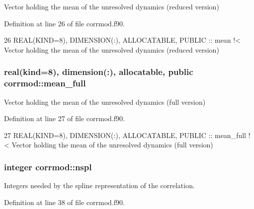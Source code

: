 Vector holding the mean of the unresolved dynamics (reduced version) 



Definition at line 26 of file corrmod.\+f90.


\begin{DoxyCode}
26   \textcolor{keywordtype}{REAL(KIND=8)}, \textcolor{keywordtype}{DIMENSION(:)}, \textcolor{keywordtype}{ALLOCATABLE}, \textcolor{keywordtype}{PUBLIC} :: mean\textcolor{comment}{ !< Vector holding the mean of the unresolved
       dynamics (reduced version)}
\end{DoxyCode}
\subsubsection[{\texorpdfstring{mean\+\_\+full}{mean_full}}]{\setlength{\rightskip}{0pt plus 5cm}real(kind=8), dimension(\+:), allocatable, public corrmod\+::mean\+\_\+full}\hypertarget{namespacecorrmod_a9c59d06165027aa6b1751e219726564a}{}\label{namespacecorrmod_a9c59d06165027aa6b1751e219726564a}


Vector holding the mean of the unresolved dynamics (full version) 



Definition at line 27 of file corrmod.\+f90.


\begin{DoxyCode}
27   \textcolor{keywordtype}{REAL(KIND=8)}, \textcolor{keywordtype}{DIMENSION(:)}, \textcolor{keywordtype}{ALLOCATABLE}, \textcolor{keywordtype}{PUBLIC} :: mean\_full\textcolor{comment}{ !< Vector holding the mean of the unresolved
       dynamics (full version)}
\end{DoxyCode}
\subsubsection[{\texorpdfstring{nspl}{nspl}}]{\setlength{\rightskip}{0pt plus 5cm}integer corrmod\+::nspl\hspace{0.3cm}{\ttfamily [private]}}\hypertarget{namespacecorrmod_afec60f4bfbbc2a787462f2475348c4c2}{}\label{namespacecorrmod_afec60f4bfbbc2a787462f2475348c4c2}


Integers needed by the spline representation of the correlation. 



Definition at line 38 of file corrmod.\+f90.


